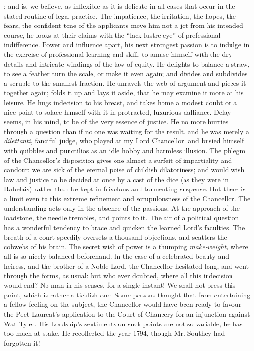 ; and is, we believe, as inflexible as it is delicate in
all cases that occur in the stated routine of legal practice. The
impatience, the irritation, the hopes, the fears, the confident
tone of the applicants move him not a jot from his intended
course, he looks at their claims with the ``lack lustre eye'' of
prefessional indifference.  Power and influence apart, his next
strongest passion is to indulge in the exercise of professional
learning and skill, to amuse himself with the dry details and
intricate windings of the law of equity. He delights to balance a
straw, to see a feather turn the scale, or make it even again; and
divides and subdivides a scruple to the smallest fraction. He
unravels the web of argument and pieces it together again; folds
it up and lays it aside, that he may examine it more at his
leisure. He hugs indecision to his breast, and takes home a modest
doubt or a nice point to solace himself with it in protracted,
luxurious dalliance. Delay seems, in his mind, to be of the very
essence of justice. He no more hurries through a question than if
no one was waiting for the result, and he was merely a
\emph{dilettanti}, fanciful judge, who played at my Lord
Chancellor, and busied himself with quibbles and punctilios as an
idle hobby and harmless illusion. The phlegm of the Chancellor's
disposition gives one almost a surfeit of impartiality and
candour: we are sick of the eternal poise of childish
dilatoriness; and would wish law and justice to be decided at once
by a cast of the dice (as they were in Rabelais) rather than be
kept in frivolous and tormenting suspense. But there is a limit
even to this extreme refinement and scrupulousness of the
Chancellor. The understanding acts only in the absence of the
passions. At the approach of the loadstone, the needle trembles,
and points to it. The air of a political question has a wonderful
tendency to brace and quicken the learned Lord's faculties. The
breath of a court speedily oversets a thousand objections, and
scatters the cobwebs of his brain. The secret wish of power is a
thumping \emph{make-weight,} where all is so nicely-balanced
beforehand. In the case of a celebrated beauty and heiress, and
the brother of a Noble Lord, the Chancellor hesitated long, and
went through the forms, as usual: but who ever doubted, where all
this indecision would end? No man in his senses, for a single
instant!  We shall not press this point, which is rather a
ticklish one. Some persons thought that from entertaining a
fellow-feeling on the subject, the Chancellor would have been
ready to favour the Poet-Laureat's application to the Court of
Chancery for an injunction against Wat Tyler. His Lordship's
sentiments on such points are not so variable, he has too much at
stake. He recollected the year 1794, though Mr. Southey had
forgotten it!\textemdash

